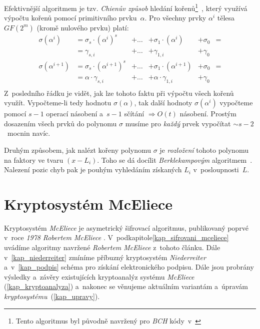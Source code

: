 \documentclass[thesis=M,czech,hidelinks]{FITthesis}[2012/06/26]
\newcommand{\0}{{\textcolor[gray]{0.75}{0}}}
\begin{document}
Efektivnější algoritmem je tzv. \emph{Chienův způsob} hledání kořenů\footnote{
    Tento algoritmus byl původně navržený pro \emph{BCH} kódy~v~\cite{Chien}
}~\cite{FIT_AAK,Heyse}, který využívá výpočtu kořenů pomocí primitivního
prvku~$\alpha$. Pro všechny prvky $\alpha^i$ tělesa $GF(2^m)$ (kromě nulového
prvku) platí:
\begin{align*}
    \sigma\left(\alpha^i\right)     &= \sigma_s \cdot \left(\alpha^i\right)^s     &+ \ldots &+ \sigma_1 \cdot \left(\alpha^i\right)     &+ \sigma_0 &= \\
                                    &= \gamma_{s,i}                               &+ \ldots &+ \gamma_{1,i}                             &+ \gamma_0 &  \\
    \sigma\left(\alpha^{i+1}\right) &= \sigma_s \cdot \left(\alpha^{i+1}\right)^s &+ \ldots &+ \sigma_1 \cdot \left(\alpha^{i+1}\right) &+ \sigma_0 &= \\
                                    &= \alpha \cdot \gamma_{s,i}                  &+ \ldots &+ \alpha \cdot \gamma_{1,i}                &+ \gamma_0 &  \\
\end{align*}
Z~posledního řádku je vidět, jak lze tohoto faktu při výpočtu všech kořenů
využít. Vypočteme-li tedy hodnotu $\sigma(\alpha)$, tak další hodnoty
$\sigma\left(\alpha^i\right)$ vypočteme pomocí $s-1$ operací násobení a~$s-1$
sčítání $\Rightarrow O(t)$ násobení. Prostým dosazením všech prvků do polynomu
$\sigma$ musíme pro \emph{každý} prvek vypočítat $\sim s-2$~mocnin navíc.

Druhým způsobem, jak nalézt kořeny polynomu $\sigma$ je \emph{rozložení} tohoto
polynomu na faktory ve tvaru $(x-L_i)$. Toho se dá docílit \emph{Berklekampovým}
algoritmem~\cite{Berlekamp3}. Nalezení pozic chyb pak je pouhým vyhledáním
získaných $L_i$ v~posloupnosti~$L$.





\chapter{Kryptosystém McEliece}\label{kap_mceliece}

Kryptosystém \emph{McEliece} je asymetrický šifrovací algoritmus, publikovaný
poprvé v~roce \emph{1978} \emph{Robertem McEliece} \cite{McEliece}.
V~podkapitole\ref{kap_sifrovani_mceliece} uvádíme algoritmy navržené
\emph{Robertem McEliece} z~tohoto článku. Dále v~\ref{kap_niederreiter} zmíníme
příbuzný kryptosystém \emph{Niederreiter} a~v~\ref{kap_podpis} schéma pro
získání elektronického podpisu. Dále jsou probrány výsledky a~závěry
existujících kryptoanalýz systému \emph{McEliece} (\ref{kap_kryptoanalyza})
a~nakonec se věnujeme aktuálním variantám a~úpravám
\emph{kryptosystému}~(\ref{kap_upravy}).
\end{document}
